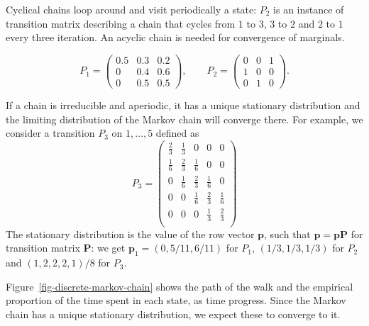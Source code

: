 \documentclass[
  11pt,
  letterpaper,
]{scrbook}
\theoremstyle{definition}
\theoremstyle{definition}
\theoremstyle{definition}
\theoremstyle{plain}
\theoremstyle{remark}
\begin{document}
Cyclical chains loop around and visit periodically a state: \(P_2\) is
an instance of transition matrix describing a chain that cycles from
\(1\) to \(3\), \(3\) to \(2\) and \(2\) to \(1\) every three iteration.
An acyclic chain is needed for convergence of marginals.

\[
P_1 = \begin{pmatrix}
0.5 & 0.3 & 0.2 \\
0 & 0.4 & 0.6 \\
0 & 0.5 & 0.5
\end{pmatrix}, 
\qquad 
P_2 = \begin{pmatrix}
0 & 0 & 1 \\
1 & 0 & 0 \\
0 & 1 & 0
\end{pmatrix}.
\]

If a chain is irreducible and aperiodic, it has a unique stationary
distribution and the limiting distribution of the Markov chain will
converge there. For example, we consider a transition \(P_3\) on
\(1, \ldots, 5\) defined as \[
P_3 = \begin{pmatrix}
\frac{2}{3} & \frac{1}{3} &  0 & 0 & 0 \\
\frac{1}{6} & \frac{2}{3} & \frac{1}{6} & 0 & 0 \\
0 & \frac{1}{6} & \frac{2}{3} & \frac{1}{6} & 0 \\
0 & 0 & \frac{1}{6} & \frac{2}{3} & \frac{1}{6} \\
0 & 0 & 0 &  \frac{1}{3}  & \frac{2}{3} \\
\end{pmatrix}
\] The stationary distribution is the value of the row vector
\(\boldsymbol{p}\), such that
\(\boldsymbol{p} = \boldsymbol{p}\mathbf{P}\) for transition matrix
\(\mathbf{P}\): we get \(\boldsymbol{p}_1=(0, 5/11, 6/11)\) for \(P_1\),
\((1/3, 1/3, 1/3)\) for \(P_2\) and \((1,2,2,2,1)/8\) for \(P_3\).

Figure~\ref{fig-discrete-markov-chain} shows the path of the walk and
the empirical proportion of the time spent in each state, as time
progress. Since the Markov chain has a unique stationary distribution,
we expect these to converge to it.
\end{document}

